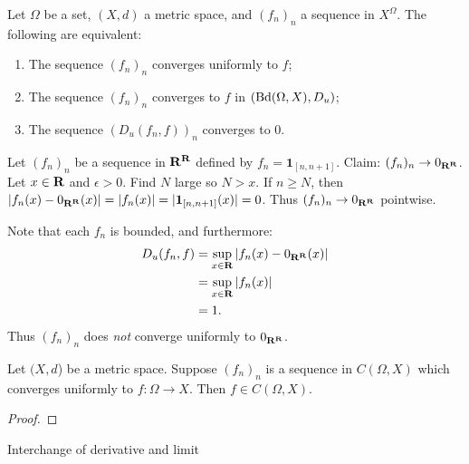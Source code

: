 \documentclass[12pt,twoside,openany]{memoir}
\begin{document}
    \begin{proposition}
        Let $\Omega$ be a set, $(X,d)$ a metric space, and $(f_n)_n$ a sequence in $X^\Omega$. The following are equivalent:
            \begin{enumerate}[label = (\arabic*),itemsep=1pt,topsep=3pt]
                \item The sequence $(f_n)_n$ converges uniformly to $f$;
                \item The sequence $(f_n)_n$ converges to $f$ in $(\operatorname{Bd}(\Omega,X),D_u)$;
                \item The sequence $(D_u(f_n,f))_n$ converges to 0.
            \end{enumerate}
    \end{proposition}

    \begin{example}
        Let $(f_n)_n$ be a sequence in $\mathbf{R}^{\mathbf{R}}$ defined by $f_n = \mathbf{1}_{[n,n+1]}$. Claim: $(f_n)_n \rightarrow 0_{\mathbf{R}^{\mathbf{R}}}$. Let $x \in \mathbf{R}$ and $\epsilon > 0$. Find $N$ large so $N > x$. If $n \geq N$, then $|f_n(x) - 0_{\mathbf{R}^{\mathbf{R}}}(x)| = |f_n(x)| = |\mathbf{1}_{[n,n+1]}(x)| = 0$. Thus $(f_n)_n \rightarrow 0_{\mathbf{R}^{\mathbf{R}}}$ pointwise.

        Note that each $f_n$ is bounded, and furthermore:
            \begin{equation*}
            \begin{split}
                D_u(f_n,f)
                & = \sup_{x \in \mathbf{R}}|f_n(x) - 0_{\mathbf{R}^{\mathbf{R}}}(x)| \\
                & = \sup_{x \in \mathbf{R}}|f_n(x)| \\
                & = 1.
            \end{split}
            \end{equation*}
        Thus $(f_n)_n$ does \textit{not} converge uniformly to $0_{\mathbf{R}^{\mathbf{R}}}$.
    \end{example}

    \begin{theorem}
       Let $(X,d$) be a metric space. Suppose $(f_n)_n$ is a sequence in $C(\Omega,X)$ which converges uniformly to $f:\Omega \rightarrow X$. Then $f \in C(\Omega,X)$.
    \end{theorem}
        \begin{proof}
            
        \end{proof}

    \begin{theorem}
        Interchange of derivative and limit
    \end{theorem}
\end{document}
